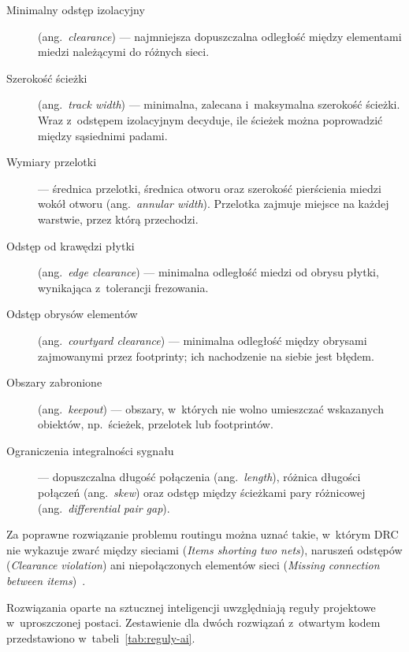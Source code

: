 \begin{description}
  \item[Minimalny odstęp izolacyjny] (ang.~\emph{clearance}) --- najmniejsza
    dopuszczalna odległość między elementami miedzi należącymi do różnych sieci.
  \item[Szerokość ścieżki] (ang.~\emph{track width}) --- minimalna, zalecana
    i~maksymalna szerokość ścieżki. Wraz z~odstępem izolacyjnym decyduje, ile
    ścieżek można poprowadzić między sąsiednimi padami.
  \item[Wymiary przelotki] --- średnica przelotki, średnica otworu oraz
    szerokość pierścienia miedzi wokół otworu (ang.~\emph{annular width}).
    Przelotka zajmuje miejsce na każdej warstwie, przez którą przechodzi.
  \item[Odstęp od krawędzi płytki] (ang.~\emph{edge clearance}) --- minimalna
    odległość miedzi od obrysu płytki, wynikająca z~tolerancji frezowania.
  \item[Odstęp obrysów elementów] (ang.~\emph{courtyard clearance}) ---
    minimalna odległość między obrysami zajmowanymi przez footprinty; ich
    nachodzenie na siebie jest błędem.
  \item[Obszary zabronione] (ang.~\emph{keepout}) --- obszary, w~których nie
    wolno umieszczać wskazanych obiektów, np.~ścieżek, przelotek lub footprintów.
  \item[Ograniczenia integralności sygnału] --- dopuszczalna długość połączenia
    (ang.~\emph{length}), różnica długości połączeń (ang.~\emph{skew}) oraz
    odstęp między ścieżkami pary różnicowej (ang.~\emph{differential pair gap}).
\end{description}

Za poprawne rozwiązanie problemu routingu można uznać takie, w~którym DRC nie
wykazuje zwarć między sieciami (\emph{Items shorting two nets}), naruszeń
odstępów (\emph{Clearance violation}) ani niepołączonych elementów sieci
(\emph{Missing connection between items})~\cite{KiCad_PCBEditor_DRC}.

Rozwiązania oparte na sztucznej inteligencji uwzględniają reguły projektowe
w~uproszczonej postaci. Zestawienie dla dwóch rozwiązań z~otwartym kodem
przedstawiono w~tabeli~\ref{tab:reguly-ai}.

